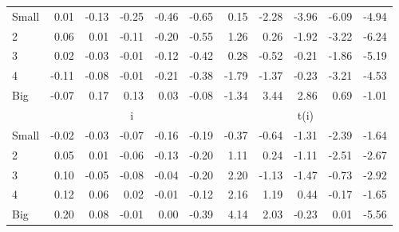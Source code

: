 \begin{table}[!ht]
\begin{tabular}{lrrrrrrrrrr}
    \\
      \cmidrule(r){2-6} \cmidrule(r){7-11}

    Small   & 0.01  & -0.13  & -0.25  & -0.46  & -0.65  & 0.15  & -2.28  & -3.96  & -6.09  & -4.94  \\
         2  & 0.06  & 0.01  & -0.11  & -0.20  & -0.55  & 1.26  & 0.26  & -1.92  & -3.22  & -6.24  \\
         3  & 0.02  & -0.03  & -0.01  & -0.12  & -0.42  & 0.28  & -0.52  & -0.21  & -1.86  & -5.19  \\
         4  & -0.11  & -0.08  & -0.01  & -0.21  & -0.38  & -1.79  & -1.37  & -0.23  & -3.21  & -4.53  \\
    Big     & -0.07  & 0.17  & 0.13  & 0.03  & -0.08  & -1.34  & 3.44  & 2.86  & 0.69  & -1.01  \\

  
    
      & \multicolumn{5}{c}{i} & \multicolumn{5}{c}{t(i)}
    
    \\
      \cmidrule(r){2-6} \cmidrule(r){7-11}

    Small   & -0.02  & -0.03  & -0.07  & -0.16  & -0.19  & -0.37  & -0.64  & -1.31  & -2.39  & -1.64  \\
         2  & 0.05  & 0.01  & -0.06  & -0.13  & -0.20  & 1.11  & 0.24  & -1.11  & -2.51  & -2.67  \\
         3  & 0.10  & -0.05  & -0.08  & -0.04  & -0.20  & 2.20  & -1.13  & -1.47  & -0.73  & -2.92  \\
         4  & 0.12  & 0.06  & 0.02  & -0.01  & -0.12  & 2.16  & 1.19  & 0.44  & -0.17  & -1.65  \\
    Big     & 0.20  & 0.08  & -0.01  & 0.00  & -0.39  & 4.14  & 2.03  & -0.23  & 0.01  & -5.56  \\

  

  \bottomrule
\end{tabular}
\label{tbl:25_Size_Var_FF2016}
\end{table}
